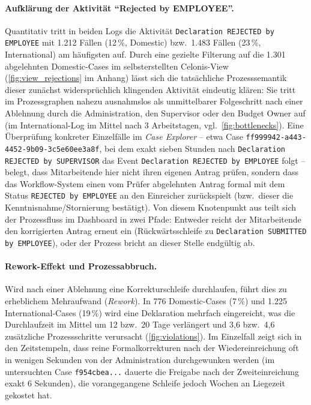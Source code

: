 \paragraph{Aufklärung der Aktivität \enquote{Rejected by EMPLOYEE}.}
Quantitativ tritt in beiden Logs die Aktivität \texttt{Declaration REJECTED by EMPLOYEE} mit 1.212 Fällen (12\,\%, Domestic) bzw.\ 1.483 Fällen (23\,\%, International) am häufigsten auf. Durch eine gezielte Filterung auf die 1.301 abgelehnten Domestic-Cases im selbsterstellten Celonis-View (\autoref{fig:view_rejections} im Anhang) lässt sich die tatsächliche Prozesssemantik dieser zunächst widersprüchlich klingenden Aktivität eindeutig klären: Sie tritt im Prozessgraphen nahezu ausnahmslos als unmittelbarer Folgeschritt nach einer Ablehnung durch die Administration, den Supervisor oder den Budget Owner auf (im International-Log im Mittel nach 3 Arbeitstagen, vgl.\ \autoref{fig:bottlenecks}). Eine Überprüfung konkreter Einzelfälle im \textit{Case Explorer} – etwa Case \texttt{ff999942-a443-4452-9b09-3c5e60ee3a8f}, bei dem exakt sieben Stunden nach \texttt{Declaration REJECTED by SUPERVISOR} das Event \texttt{Declaration REJECTED by EMPLOYEE} folgt – belegt, dass Mitarbeitende hier nicht ihren eigenen Antrag prüfen, sondern dass das Workflow-System einen vom Prüfer abgelehnten Antrag formal mit dem Status \texttt{REJECTED by EMPLOYEE} an den Einreicher zurückspielt (bzw.\ dieser die Kenntnisnahme/Stornierung bestätigt). Von diesem Knotenpunkt aus teilt sich der Prozessfluss im Dashboard in zwei Pfade: Entweder reicht der Mitarbeitende den korrigierten Antrag erneut ein (Rückwärtsschleife zu \texttt{Declaration SUBMITTED by EMPLOYEE}), oder der Prozess bricht an dieser Stelle endgültig ab.

\paragraph{Rework-Effekt und Prozessabbruch.}
Wird nach einer Ablehnung eine Korrekturschleife durchlaufen, führt dies zu erheblichem Mehraufwand (\textit{Rework}). In 776 Domestic-Cases (7\,\%) und 1.225 International-Cases (19\,\%) wird eine Deklaration mehrfach eingereicht, was die Durchlaufzeit im Mittel um 12 bzw.\ 20 Tage verlängert und 3,6 bzw.\ 4,6 zusätzliche Prozessschritte verursacht (\autoref{fig:violations}). Im Einzelfall zeigt sich in den Zeitstempeln, dass reine Formalkorrekturen nach der Wiedereinreichung oft in wenigen Sekunden von der Administration durchgewunken werden (im untersuchten Case \texttt{f954cbea...} dauerte die Freigabe nach der Zweiteinreichung exakt 6 Sekunden), die vorangegangene Schleife jedoch Wochen an Liegezeit gekostet hat.

